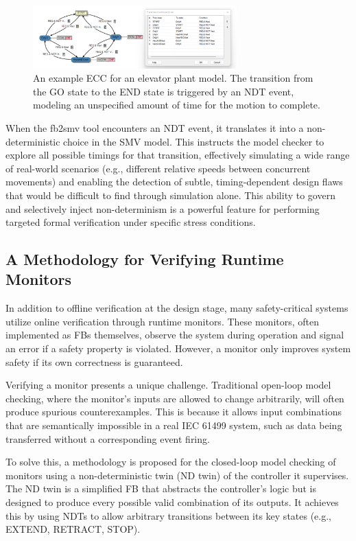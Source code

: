 \begin{figure}[h]
\centering
\includegraphics[width=0.7\textwidth]{MX_Papers/Paper3/pic/ECC-moniteur.png}
\caption{An example ECC for an elevator plant model. The transition from the GO state to the END state is triggered by an NDT event, modeling an unspecified amount of time for the motion to complete.}
\label{fig:ecc_ndt}
\end{figure}

When the fb2smv tool encounters an NDT event, it translates it into a non-deterministic choice in the SMV model. This instructs the model checker to explore all possible timings for that transition, effectively simulating a wide range of real-world scenarios (e.g., different relative speeds between concurrent movements) and enabling the detection of subtle, timing-dependent design flaws that would be difficult to find through simulation alone. This ability to govern and selectively inject non-determinism is a powerful feature for performing targeted formal verification under specific stress conditions.

\subsection{A Methodology for Verifying Runtime Monitors}

In addition to offline verification at the design stage, many safety-critical systems utilize online verification through runtime monitors. These monitors, often implemented as FBs themselves, observe the system during operation and signal an error if a safety property is violated. However, a monitor only improves system safety if its own correctness is guaranteed.

Verifying a monitor presents a unique challenge. Traditional open-loop model checking, where the monitor's inputs are allowed to change arbitrarily, will often produce spurious counterexamples. This is because it allows input combinations that are semantically impossible in a real IEC 61499 system, such as data being transferred without a corresponding event firing.

To solve this, a methodology is proposed for the closed-loop model checking of monitors using a non-deterministic twin (ND twin) of the controller it supervises. The ND twin is a simplified FB that abstracts the controller's logic but is designed to produce every possible valid combination of its outputs. It achieves this by using NDTs to allow arbitrary transitions between its key states (e.g., EXTEND, RETRACT, STOP).

